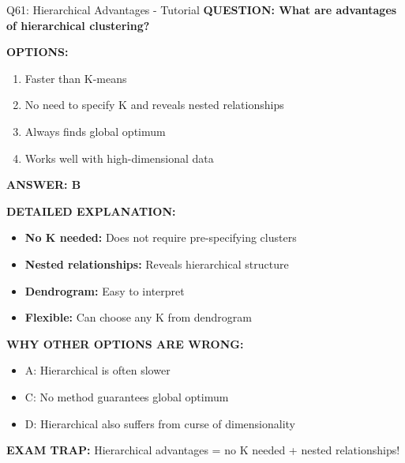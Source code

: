 \documentclass[8pt]{beamer}
\begin{document}
	\begin{frame}{Q61: Hierarchical Advantages - Tutorial}
		\fontsize{6.5}{7.5}\selectfont
		\textbf{QUESTION: What are advantages of hierarchical clustering?}
		
		\vspace{0.1cm}
		\textbf{OPTIONS:}
		\begin{enumerate}
			\item Faster than K-means
			\item No need to specify K and reveals nested relationships
			\item Always finds global optimum
			\item Works well with high-dimensional data
		\end{enumerate}
		
		\vspace{0.1cm}
		\textcolor{myblue}{\textbf{ANSWER: B}}
		
		\vspace{0.1cm}
		\textbf{DETAILED EXPLANATION:}
		\begin{itemize}
			\item \textbf{No K needed:} Does not require pre-specifying clusters
			\item \textbf{Nested relationships:} Reveals hierarchical structure
			\item \textbf{Dendrogram:} Easy to interpret
			\item \textbf{Flexible:} Can choose any K from dendrogram
		\end{itemize}
		
		\vspace{0.1cm}
		\textcolor{myred}{\textbf{WHY OTHER OPTIONS ARE WRONG:}}
		\begin{itemize}
			\item \textcolor{myred}{A:} Hierarchical is often slower
			\item \textcolor{myred}{C:} No method guarantees global optimum
			\item \textcolor{myred}{D:} Hierarchical also suffers from curse of dimensionality
		\end{itemize}
		
		\textcolor{myred}{\textbf{EXAM TRAP:}} Hierarchical advantages = \textcolor{myblue}{no K needed + nested relationships}!
	\end{frame}
	
\end{document}
